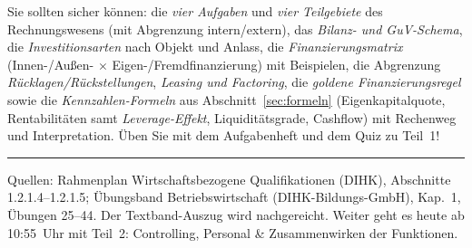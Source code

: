 \documentclass[11pt, a4paper]{article}
\begin{document}
\begin{merksatz}[title={\bfseries Wichtig für die Prüfungsvorbereitung (Teil 1)}]
Sie sollten sicher können: die \emph{vier Aufgaben} und \emph{vier Teilgebiete} des
Rechnungswesens (mit Abgrenzung intern/extern), das \emph{Bilanz- und GuV-Schema}, die
\emph{Investitionsarten} nach Objekt
und Anlass, die \emph{Finanzierungsmatrix} (Innen-/Außen- $\times$ Eigen-/Fremdfinanzierung)
mit Beispielen, die Abgrenzung \emph{Rücklagen/Rückstellungen}, \emph{Leasing und
Factoring}, die \emph{goldene Finanzierungsregel} sowie die \emph{Kennzahlen-Formeln} aus
Abschnitt~\ref{sec:formeln} (Eigenkapitalquote, Rentabilitäten samt
\emph{Leverage-Effekt}, Liquiditätsgrade,
Cashflow) mit Rechenweg und Interpretation. Üben Sie mit dem Aufgabenheft und dem Quiz
zu Teil~1!
\end{merksatz}

\vspace{1em}
\hrule
\vspace{0.8em}
\noindent\textsf{\small Quellen: Rahmenplan Wirtschaftsbezogene Qualifikationen (DIHK),
Abschnitte 1.2.1.4--1.2.1.5; Übungsband Betriebswirtschaft (DIHK-Bildungs-GmbH),
Kap.~1, Übungen 25--44. Der Textband-Auszug wird nachgereicht. Weiter geht es heute ab
10:55~Uhr mit Teil~2: Controlling, Personal \& Zusammenwirken der Funktionen.}
\end{document}
